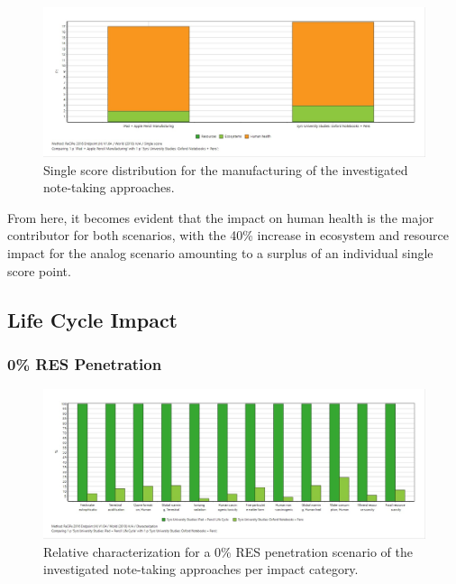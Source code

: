 \begin{figure}[H]
    \centering
    \includegraphics[width=\textwidth]{images/Manufacturing/Single_Score_Manufacturing.JPG}
    \caption{Single score distribution for the manufacturing of the investigated note-taking approaches.}\label{fig:single_score_manufacturing}
\end{figure}

From here, it becomes evident that the impact on human health is the major contributor for both scenarios, with the 40\% increase in ecosystem and resource impact for the analog scenario amounting to a surplus of an individual single score point. 

\subsection{Life Cycle Impact}\label{subsec:results_life_cycle}

\subsubsection{0\% RES Penetration}

\begin{figure}[H]
    \centering
    \includegraphics[width=\textwidth]{images/RES_0/Characterization_RES_0.JPG}
    \caption{Relative characterization for a 0\% RES penetration scenario of the investigated note-taking approaches per impact category.}\label{fig:characterization_RES_0}
\end{figure}

